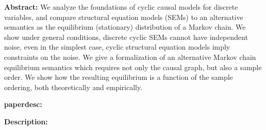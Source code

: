 \documentclass{article}
\begin{document}

\textbf{Abstract:} We analyze the foundations of cyclic causal models for discrete variables, and compare structural equation models (SEMs) to an alternative semantics as the equilibrium (stationary) distribution of a Markov chain. We show under general conditions, discrete cyclic SEMs cannot have independent noise, even in the simplest case, cyclic structural equation models imply constraints on the noise. We give a formalization of an alternative Markov chain equilibrium semantics which requires not only the causal graph, but also a sample order. We show how the resulting equilibrium is a function of the sample ordering, both theoretically and empirically.

\textbf{paperdesc:} 

\textbf{Description:} 











\newpage



\end{document}
